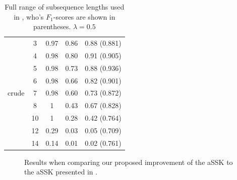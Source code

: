 \begin{table}
\begin{tabular}{| c | c | c | c | c | }
		
		& 3 & 0.97 & 0.86 &  0.88  (0.881)  \\ 
		& 4 & 0.98 & 0.80 & 0.91  (0.905)   \\ 
		& 5 & 0.98 & 0.73 &  0.88 (0.936)   \\ 
		& 6 & 0.98 & 0.66 &  0.82  (0.901)  \\
		crude& 7 & 0.98 & 0.60 &  0.73 (0.872)  \\
		& 8 & 1 & 0.43 &  0.67   (0.828) \\ 
		& 10 & 1 & 0.28 &  0.42   (0.764) \\ 
		& 12 & 0.29 & 0.03 &  0.05   (0.709) \\ 
		& 14 & 0.14 & 0.01 &  0.02   (0.761) \\ \hline 
			
	\end{tabular}
\caption{Full range of subsequence lengths used in \cite{lodhi}, who's  $ F_1 $-scores are shown in parentheses.  $  \lambda = 0.5$\label{tab:appendix_ssk_n}}

\end{table}


\begin{figure}
	\centering
	\quad{}
	\caption{Results when comparing our proposed improvement of the aSSK to the aSSK presented in \cite{lodhi}.\label{fig:improved_assk}}
\end{figure}


